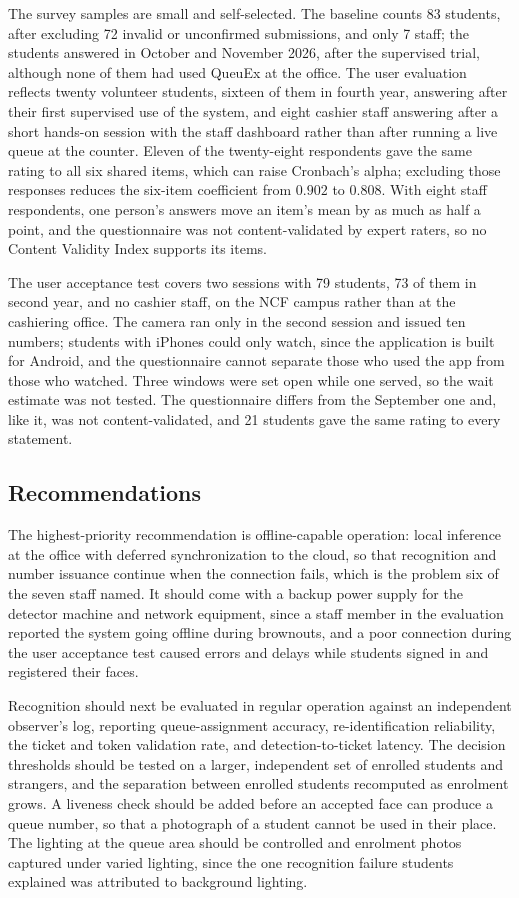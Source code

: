\documentclass{research}
\newcommand{\sysname}{QueuEx}
\begin{document}
The survey samples are small and self-selected. The baseline counts 83
students, after excluding 72 invalid or unconfirmed submissions, and
only 7 staff; the students answered in October and November 2026, after
the supervised trial, although none of them had used \sysname{} at the
office. The user evaluation reflects twenty volunteer students, sixteen
of them in fourth year, answering after their first supervised use of
the system, and eight cashier staff answering after a short hands-on
session with the staff dashboard rather than after running a live queue
at the counter. Eleven of the twenty-eight respondents gave the same
rating to all six shared items, which can raise Cronbach's alpha;
excluding those responses reduces the six-item coefficient from $0.902$
to $0.808$. With eight staff respondents, one person's answers move an
item's mean by as much as half a point, and the questionnaire was not
content-validated by expert raters, so no Content Validity Index
supports its items.

The user acceptance test covers two sessions with 79 students, 73 of
them in second year, and no cashier staff, on the NCF campus rather than
at the cashiering office. The camera ran only in the second session and
issued ten numbers; students with iPhones could only watch, since the
application is built for Android, and the questionnaire cannot separate
those who used the app from those who watched. Three windows were set
open while one served, so the wait estimate was not tested. The
questionnaire differs from the September one and, like it, was not
content-validated, and 21 students gave the same rating to every
statement.

\subsection{Recommendations}
\label{sec:recommendations}

The highest-priority recommendation is offline-capable operation: local
inference at the office with deferred synchronization to the cloud, so
that recognition and number issuance continue when the connection
fails, which is the problem six of the seven staff named. It should come
with a backup power supply for the detector machine and network
equipment, since a staff member in the evaluation reported the system
going offline during brownouts, and a poor connection during the user
acceptance test caused errors and delays while students signed in and
registered their faces.

Recognition should next be evaluated in regular operation against an
independent observer's log, reporting queue-assignment accuracy,
re-identification reliability, the ticket and token validation rate, and
detection-to-ticket latency. The decision thresholds should be tested on
a larger, independent set of enrolled students and strangers, and the
separation between enrolled students recomputed as enrolment grows. A
liveness check should be added before an accepted face can produce a
queue number, so that a photograph of a student cannot be used in their
place. The lighting at the queue area should be controlled and enrolment
photos captured under varied lighting, since the one recognition failure
students explained was attributed to background lighting.
\end{document}
